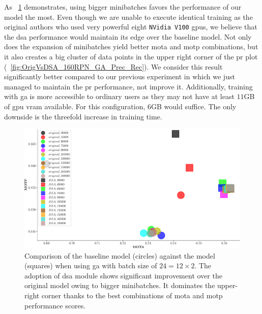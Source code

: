 As \figtext{}~\ref{fig:OrigVsDSA_160RPN_GA_MOTA_MOTP} demonstrates, using bigger minibatches favors the performance of our model the most. Even though we are unable to execute identical training as the original authors who used very powerful eight \texttt{NVidia V100} \glspl{gpu}, we believe that the \gls{dsa} performance would maintain its edge over the baseline model. Not only does the expansion of minibatches yield better \gls{mota} and \gls{motp} combinations, but it also creates a big cluster of data points in the upper right corner of the \gls{pr} plot (\figtext{}~\ref{fig:OrigVsDSA_160RPN_GA_Prec_Rec}). We consider this result significantly better compared to our previous experiment in which we just managed to maintain the \gls{pr} performance, not improve it. Additionally, training with \gls{ga} is more accessible to ordinary users as they may not have at least $11$GB of \gls{gpu} \gls{vram} available. For this configuration, $6$GB would suffice. The only downside is the threefold increase in training time.

\begin{figure}[t]
    \centerline{\includegraphics[width=\linewidth]{figures/siamese_tracking/tracker_cmp_160_2x12_vs_160_2x2_DSA_GA_MOTA_MOTP.pdf}}
    \caption[\gls{dsa} evaluation with \gls{ga} - primary metrics]{Comparison of the baseline model (circles) against the \dsamodel{} model (squares) when using \gls{ga} with batch size of $24 = 12 \times 2$. The adoption of \gls{dsa} module shows significant improvement over the original model owing to bigger minibatches. It dominates the upper-right corner thanks to the best combinations of \gls{mota} and \gls{motp} performance scores.}
    \label{fig:OrigVsDSA_160RPN_GA_MOTA_MOTP}
\end{figure}

